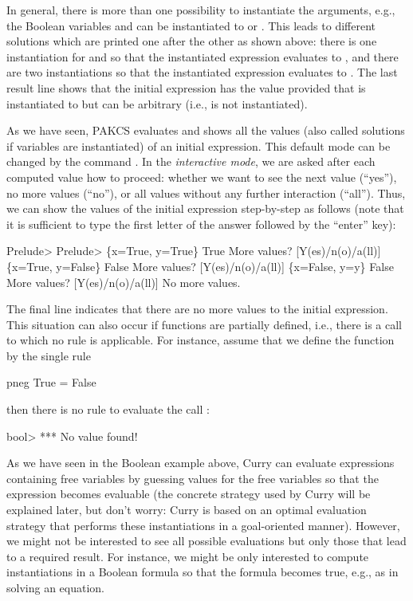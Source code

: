 In general, there is more than one possibility
to instantiate the arguments, e.g., the Boolean variables
 and  can be instantiated to  or .
This leads to different solutions which are printed
one after the other as shown above: there is one instantiation
for  and  so that the instantiated expression
evaluates to , and there are two instantiations
so that the instantiated expression evaluates to .
The last result line shows that the initial expression has the value
 provided that  is instantiated to 
but  can be arbitrary (i.e.,  is not instantiated).

As we have seen, PAKCS evaluates and shows all the values
(also called solutions if variables are instantiated)
of an initial expression. This default mode can be changed
by the command .
In the \emph{interactive mode}, we are asked after each
computed value how to proceed:
whether we want to see the next value (``yes''), no more values (``no''),
or all values without any further interaction (``all'').
Thus, we can show the values of the initial expression
step-by-step as follows (note that it is sufficient to type
the first letter of the answer followed by the ``enter'' key):
\begin{prog}
Prelude> 
Prelude> 
\{x=True, y=True\}  True
More values? [Y(es)/n(o)/a(ll)] 
\{x=True, y=False\} False
More values? [Y(es)/n(o)/a(ll)] 
\{x=False, y=y\} False
More values? [Y(es)/n(o)/a(ll)] 
No more values.
\end{prog}
The final line indicates that there are no more values to the
initial expression. This situation can also occur if functions
are partially defined, i.e., there is a call to which no rule
is applicable. For instance, assume that we define the function
 by the single rule
\begin{prog}
pneg True = False
\end{prog}
then there is no rule to evaluate the call :
\begin{prog}
bool> 
*** No value found!
\end{prog}
As we have seen in the Boolean example above,
Curry can evaluate expressions containing free variables
by guessing values for the free variables so that the expression
becomes evaluable (the concrete strategy used by Curry will be
explained later, but don't worry: Curry is based on an optimal
evaluation strategy \cite{AntoyEchahedHanus00JACM} that performs
these instantiations in a goal-oriented manner).
However, we might not be interested to see
all possible evaluations but only those that lead to a required
result. For instance, we might be only interested to compute
instantiations in a Boolean formula so that the formula becomes true,
e.g., as in solving an equation.

